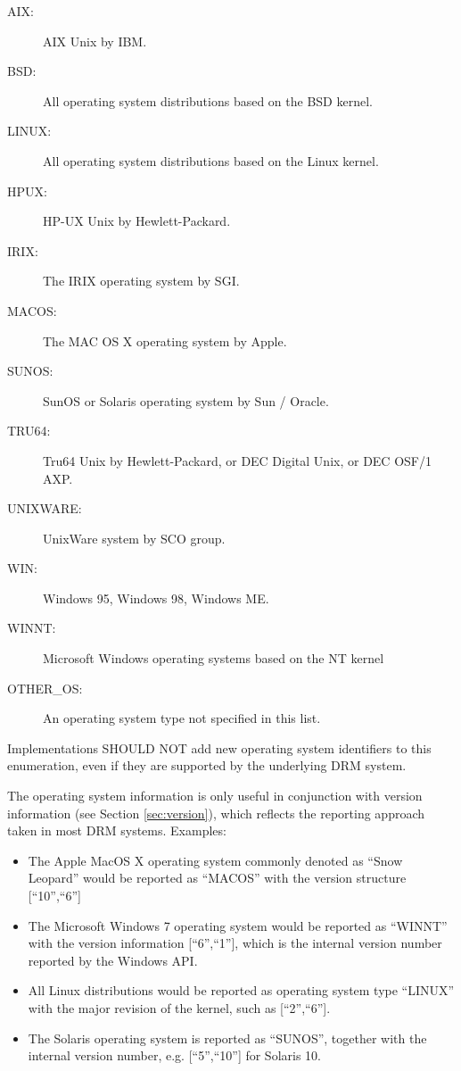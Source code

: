 \documentclass{article}
\begin{document}
\begin{description}
\item[AIX:] AIX Unix by IBM.
\item[BSD:] All operating system distributions based on the BSD kernel.
\item[LINUX:] All operating system distributions based on the Linux kernel.
\item[HPUX:] HP-UX Unix by Hewlett-Packard.
\item[IRIX:] The IRIX operating system by SGI.
\item[MACOS:] The MAC OS X operating system by Apple.
\item[SUNOS:] SunOS or Solaris operating system by Sun / Oracle.
\item[TRU64:] Tru64 Unix by Hewlett-Packard, or DEC Digital Unix, or DEC OSF/1 AXP.
\item[UNIXWARE:] UnixWare system by SCO group.
\item[WIN:] Windows 95, Windows 98, Windows ME.
\item[WINNT:] Microsoft Windows operating systems based on the NT kernel
\item[OTHER\_OS:] An operating system type not specified in this list.
\end{description}

Implementations SHOULD NOT add new operating system identifiers to this enumeration, even if they are supported by the underlying DRM system.

The operating system information is only useful in conjunction with version information (see Section \ref{sec:version}), which reflects the reporting approach taken in most DRM systems. Examples:

\begin{itemize}
	\item The Apple MacOS X operating system commonly denoted as \enquote{Snow Leopard} would be reported as \enquote{MACOS} with the version structure [\enquote{10},\enquote{6}]
    \item The Microsoft Windows 7 operating system would be reported as \enquote{WINNT} with the version information [\enquote{6},\enquote{1}], which is the internal version number reported by the Windows API.
    \item All Linux distributions would be reported as operating system type \enquote{LINUX} with the major revision of the kernel, such as [\enquote{2},\enquote{6}].
    \item The Solaris operating system is reported as \enquote{SUNOS}, together with the internal version number, e.g. [\enquote{5},\enquote{10}] for Solaris 10.
\end{itemize}
\end{document}

